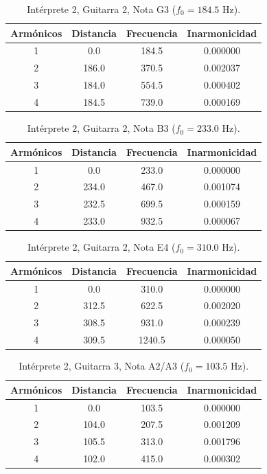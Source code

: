 \begin{table}[htbp]
  \centering
 \small
  \caption{Intérprete 2, Guitarra 2, Nota G3 ($f_0 = 184.5$ Hz).}
  \label{tab:interprete2_g2_g3}
  \begin{tabular}{cccc}
  \toprule
  Armónicos & Distancia & Frecuencia & Inarmonicidad \\
  \midrule
  1 & 0.0 & 184.5 & 0.000000 \\
  2 & 186.0 & 370.5 & 0.002037 \\
  3 & 184.0 & 554.5 & 0.000402 \\
  4 & 184.5 & 739.0 & 0.000169 \\
  \bottomrule
  \end{tabular}
\end{table}

\begin{table}[htbp]
  \centering
 \small
  \caption{Intérprete 2, Guitarra 2, Nota B3 ($f_0 = 233.0$ Hz).}
  \label{tab:interprete2_g2_b3}
  \begin{tabular}{cccc}
  \toprule
  Armónicos & Distancia & Frecuencia & Inarmonicidad \\
  \midrule
  1 & 0.0 & 233.0 & 0.000000 \\
  2 & 234.0 & 467.0 & 0.001074 \\
  3 & 232.5 & 699.5 & 0.000159 \\
  4 & 233.0 & 932.5 & 0.000067 \\
  \bottomrule
  \end{tabular}
\end{table}

\begin{table}[htbp]
  \centering
 \small
  \caption{Intérprete 2, Guitarra 2, Nota E4 ($f_0 = 310.0$ Hz).}
  \label{tab:interprete2_g2_e4}
  \begin{tabular}{cccc}
  \toprule
  Armónicos & Distancia & Frecuencia & Inarmonicidad \\
  \midrule
  1 & 0.0 & 310.0 & 0.000000 \\
  2 & 312.5 & 622.5 & 0.002020 \\
  3 & 308.5 & 931.0 & 0.000239 \\
  4 & 309.5 & 1240.5 & 0.000050 \\
  \bottomrule
  \end{tabular}
\end{table}

\begin{table}[htbp]
  \centering
 \small
  \caption{Intérprete 2, Guitarra 3, Nota A2/A3 ($f_0 = 103.5$ Hz).}
  \label{tab:interprete2_g3_a2_a3}
  \begin{tabular}{cccc}
  \toprule
  Armónicos & Distancia & Frecuencia & Inarmonicidad \\
  \midrule
  1 & 0.0 & 103.5 & 0.000000 \\
  2 & 104.0 & 207.5 & 0.001209 \\
  3 & 105.5 & 313.0 & 0.001796 \\
  4 & 102.0 & 415.0 & 0.000302 \\
  \bottomrule
  \end{tabular}
\end{table}

